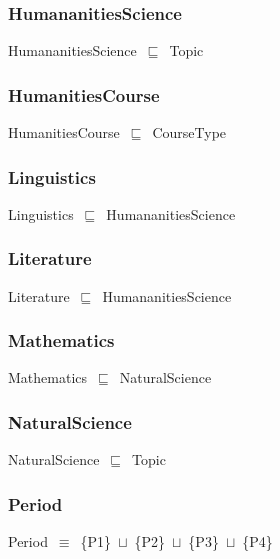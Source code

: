 \documentclass{article}
\begin{document}
\subsubsection*{HumananitiesScience}

HumananitiesScience~\ensuremath{\sqsubseteq}~Topic~

\subsubsection*{HumanitiesCourse}

HumanitiesCourse~\ensuremath{\sqsubseteq}~CourseType~

\subsubsection*{Linguistics}

Linguistics~\ensuremath{\sqsubseteq}~HumananitiesScience~

\subsubsection*{Literature}

Literature~\ensuremath{\sqsubseteq}~HumananitiesScience~

\subsubsection*{Mathematics}

Mathematics~\ensuremath{\sqsubseteq}~NaturalScience~

\subsubsection*{NaturalScience}

NaturalScience~\ensuremath{\sqsubseteq}~Topic~

\subsubsection*{Period}

Period~\ensuremath{\equiv}~\{P1\}~\ensuremath{\sqcup}~\{P2\}~\ensuremath{\sqcup}~\{P3\}~\ensuremath{\sqcup}~\{P4\}
\end{document}
